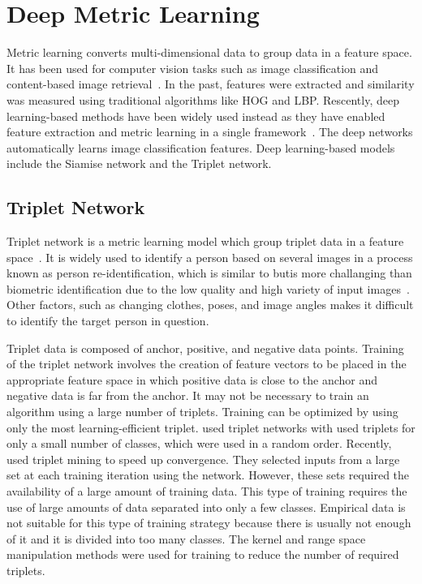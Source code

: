\label{chp:Preliminary}
\section{Deep Metric Learning}
Metric learning converts multi-dimensional data to group data in a feature space.
It has been used for computer vision tasks such as image classification and content-based image retrieval~\cite{yang2006distance}. In the past, features were extracted and similarity was measured using traditional algorithms like HOG and LBP. Rescently, deep learning-based methods have been widely used instead as they have enabled feature extraction and metric learning in a single framework~\cite{yi2014deep}. The deep networks automatically learns image classification features.
Deep learning-based models include the Siamise network and the Triplet network.

\subsection{Triplet Network}
Triplet network is a metric learning model which group triplet data in a feature space~\cite{weinberger2006distance,yang2006distance}.
It is widely used to identify a person based on  several images in a process known as person re-identification, which is similar to butis more challanging than biometric identification due to the low quality and high variety of input images~\cite{yi2014deep}. Other factors, such as changing clothes, poses, and image angles makes it difficult to identify the target person in question.

Triplet data is composed of anchor, positive, and negative data points. Training of the triplet network involves the creation of feature vectors to be placed in the appropriate feature space in which positive data is close to the anchor and negative data is far from the anchor.
It may not be necessary to train an algorithm using a large number of triplets. Training can be optimized by using only the most learning-efficient triplet. \cite{cheng2016person,ding2015deep,wang2016joint} used triplet networks with used triplets for only a small number of classes, which were used in a random order.
Recently,~\cite{schroff2015facenet} used triplet mining to speed up convergence. They selected inputs from a large set at each training iteration using the network.
However, these sets required the availability of a large amount of training data. This type of training requires the use of large amounts of data separated into only a few classes. Empirical data is not suitable for this type of training strategy because there is usually not enough of it and it is divided into too many classes.
The kernel and range space manipulation methods were used for training to reduce the number of required triplets.

